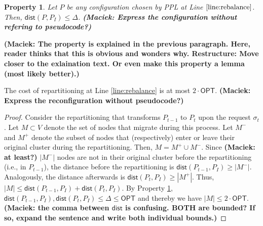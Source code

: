 \documentclass[manuscript,screen=true, review, anonymous]{acmart}
\newcommand{\OPT}{\textsf{OPT}\xspace}
\newcommand{\PPL}{\textsf{PPL}\xspace}
\newcommand{\dist}{\textsf{dist}}
\newtheorem{property}{Property}
\newcommand\maciek[1]{\color{brown}\textbf{(Maciek: #1)}\color{black}}
\begin{document}
\begin{property} \label{prop:dist<OPT}
	Let $P$ be any configuration chosen by \PPL at Line $\ref{line:rebalance}$.
	Then, $\dist(P,P_I) \leq \Delta$.
	\maciek{Express the configuration without refering to pseudocode?}
\end{property}
\maciek{The property is explained in the previous paragraph. Here, reader thinks that this is obvious and wonders why. Restructure: Move closer to the exlaination text. Or even make this property a lemma (most likely better).}

\begin{lemma}	\label{lemma:rebalancecost}
	The cost of repartitioning at Line \ref{line:rebalance} is at most $2\cdot\OPT$.
	\maciek{Express the reconfiguration without pseudocode?}
\end{lemma}
\begin{proof}
	Consider the repartitioning that transforms $P_{t-1}$ to $P_t$ upon the request $\sigma_t$.
	Let $M \subset V$ denote the set of nodes that migrate during this process.
	Let $M^-$ and $M^+$ denote the subset of nodes that (respectively)
	enter or leave their original cluster during the repartitioning.    
	Then,
	$M = M^+ \cup M^-$.
	Since \maciek{at least?} $|M^-|$ nodes are not in their original cluster before the repartitioning (i.e., in $P_{t-1}$),
	the distance before the repartitioning is $\dist(P_{t-1},P_I) \geq | M^-|$.
	Analogously,
	the distance afterwards is $\dist(P_{t},P_I) \geq | M^+|$.
	Thus,
	$|M| \leq \dist(P_{t-1},P_I) + \dist(P_{t},P_I)$.
	By Property \ref{prop:dist<OPT},
	$\dist(P_{t-1},P_I) , \dist(P_{t},P_I) \leq \Delta \leq \OPT$
	and thereby we have	
	$|M| \leq 2\cdot\OPT$.
	\maciek{the comma between $\dist$ is confusing. BOTH are bounded? If so, expand the sentence and write both individual bounds.}
\end{proof}
\end{document}
